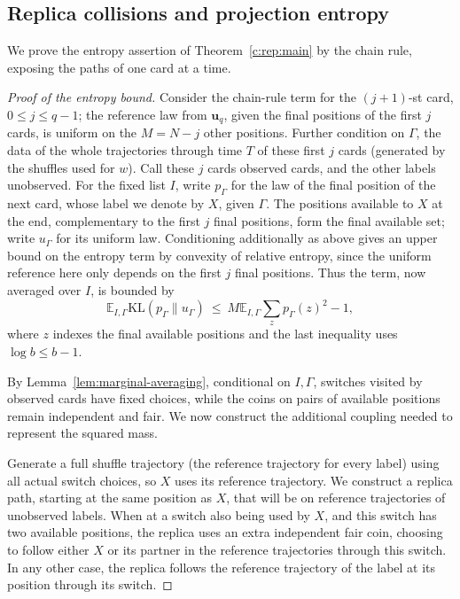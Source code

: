 \subsection{Replica collisions and projection entropy}
We prove the entropy assertion
of Theorem~\ref{c:rep:main} by the chain rule, exposing the paths of one
card at a time.

\begin{proof}[Proof of the entropy bound]
\label{c:rep:entropy-proof}
Consider the chain-rule term for the \((j+1)\)-st card,
\(0\le j\le q-1\); the reference law from \(\mathbf u_q\), given the final positions of the
first \(j\) cards, is uniform on the \(M=N-j\) other positions. Further condition on
\(\Gamma\), the data of the whole trajectories through time \(T\) of these first \(j\) cards
(generated by the shuffles used for \(w\)). Call these \(j\) cards observed cards, and the other labels
unobserved. For the fixed list \(I\), write \(p_\Gamma\) for the law of the final
position of the next card, whose label we denote by \(X\), given \(\Gamma\). The positions
available to \(X\) at the end, complementary to the first \(j\) final positions, form the final
available set; write \(u_\Gamma\) for its uniform law.
Conditioning additionally as above gives an upper bound on the entropy term by convexity
of relative entropy, since the uniform reference here only depends on the first \(j\) final
positions. Thus the term, now averaged over \(I\), is bounded by
\begin{equation}
\mathbb E_{I,\Gamma}\mathrm{KL}(p_\Gamma\|u_\Gamma)
\ \le\ M\mathbb E_{I,\Gamma}\sum_z p_\Gamma(z)^2-1,                  \label{c:rep:e2}
\end{equation}
where \(z\) indexes the final available positions and the last inequality uses \(\log b\le b-1\).

By Lemma~\ref{lem:marginal-averaging}, conditional on \(I,\Gamma\),
switches visited by observed cards have fixed choices, while the coins
on pairs of available positions remain independent and fair. We now
construct the additional coupling needed to represent the squared mass.

\label{c:rep:replica-construction}
Generate a full shuffle trajectory (the reference trajectory for every label) using all actual
switch choices, so \(X\) uses its reference trajectory. We construct a replica path, starting
at the same position as \(X\), that will be on reference trajectories of unobserved labels. When at a
switch also being used by \(X\), and this switch has two available positions, the replica uses an extra
independent fair coin, choosing to follow either \(X\) or its partner in the reference
trajectories through this switch. In any other case, the replica follows the reference
trajectory of the label at its position through its switch.


\end{proof}
